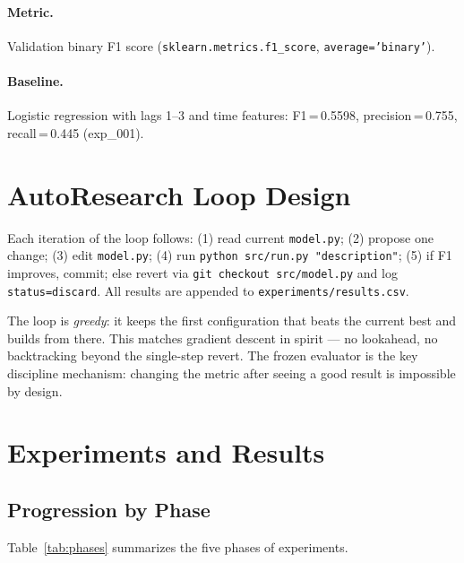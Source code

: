 \documentclass{article}
\begin{document}
\paragraph{Metric.} Validation binary F1 score (\texttt{sklearn.metrics.f1\_score},
\texttt{average='binary'}).

\paragraph{Baseline.} Logistic regression with lags 1--3 and time features:
F1\,=\,0.5598, precision\,=\,0.755, recall\,=\,0.445 (exp\_001).

\section{AutoResearch Loop Design}

Each iteration of the loop follows: (1) read current \texttt{model.py};
(2) propose one change; (3) edit \texttt{model.py}; (4) run \texttt{python src/run.py
"description"}; (5) if F1 improves, commit; else revert via \texttt{git checkout src/model.py}
and log \texttt{status=discard}. All results are appended to \texttt{experiments/results.csv}.

The loop is \textit{greedy}: it keeps the first configuration that beats the current best
and builds from there. This matches gradient descent in spirit — no lookahead, no
backtracking beyond the single-step revert. The frozen evaluator is the key discipline
mechanism: changing the metric after seeing a good result is impossible by design.

\section{Experiments and Results}

\subsection{Progression by Phase}

Table~\ref{tab:phases} summarizes the five phases of experiments.
\end{document}

